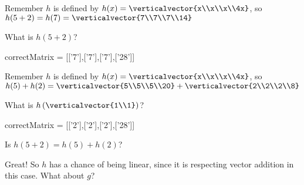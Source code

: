 \documentclass{ximera}
\begin{document}
\begin{question}
\begin{solution}
\begin{hint}
        \begin{question}
        	
       
        	
        	\begin{solution}
		\begin{hint}
			Remember $h$ is defined by $h(x) = \verticalvector{x\\x\\x\\4x}$, so
			$h(5+2) = h(7)= \verticalvector{7\\7\\7\\14}$
		\end{hint}
        	 What is $h(5+2)$?
        	\begin{matrix-answer}[name=v]
    			  correctMatrix = [['7'],['7'],['7'],['28']]
        	 \end{matrix-answer}
        	\end{solution}
        	\begin{solution}
		\begin{hint}
			Remember $h$ is defined by $h(x) =\verticalvector{x\\x\\x\\4x}$, so
			$h(5)+h(2) =  \verticalvector{5\\5\\5\\20}+\verticalvector{2\\2\\2\\8}$
		\end{hint}
        	 What is $h\left(\verticalvector{1\\1}\right)$?
        	 \begin{matrix-answer}[name=v]
    			  correctMatrix = [['2'],['2'],['2'],['28']]
        	 \end{matrix-answer}
        	\end{solution}
        	\begin{solution}
        		Is $h(5+2) = h(5)+h(2)$?
        		\begin{multiple-choice}
        		\choice[correct]{Yes}
        		\choice{No}
        		\end{multiple-choice}
        	\end{solution}
        	
        	Great!  So $h$ has a chance of being linear, since it is respecting vector addition in this case.
        	What about $g$?        	
        	

\end{question}
\end{hint}
\end{solution}
\end{question}
\end{document}
